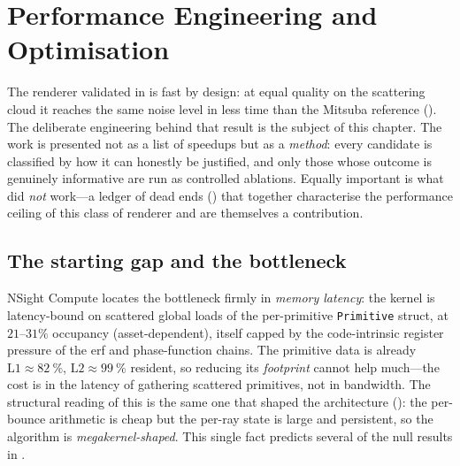 \chapter{Performance Engineering and Optimisation}
\label{ch:optimization}

The renderer validated in  is fast by design: at equal quality on the scattering
cloud it reaches the same noise level in less time than the Mitsuba reference (). The
deliberate engineering behind that result is the subject of this chapter. The work is presented not as a list of speedups but as a
\emph{method}: every candidate is classified by how it can honestly be justified, and only those whose
outcome is genuinely informative are run as controlled ablations. Equally important is what did
\emph{not} work---a ledger of dead ends () that together characterise the
performance ceiling of this class of renderer and are themselves a contribution.

\section{The starting gap and the bottleneck}
\label{sec:bottleneck}

NSight Compute locates the bottleneck firmly in
\emph{memory latency}: the kernel is latency-bound on scattered global loads of the per-primitive
\texttt{Primitive} struct, at $21$--$31\%$ occupancy (asset-dependent), itself capped by the code-intrinsic register
pressure of the erf and phase-function chains. The primitive data is already
$\mathrm{L1}\approx\SI{82}{\percent}$, $\mathrm{L2}\approx\SI{99}{\percent}$
resident, so reducing its \emph{footprint} cannot help much---the cost is in the latency of
gathering scattered primitives, not in bandwidth. The structural reading of this is the same one that
shaped the architecture (): the per-bounce arithmetic is cheap but the per-ray state
is large and persistent, so the algorithm is \emph{megakernel-shaped}. This single fact predicts
several of the null results in .

